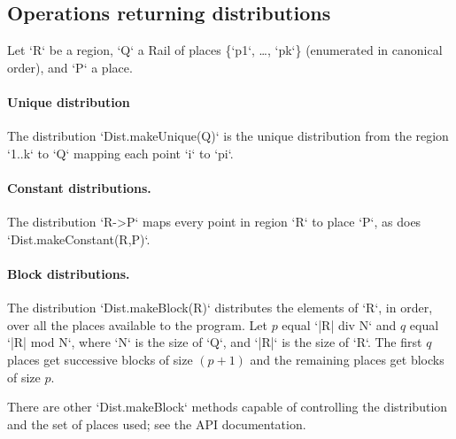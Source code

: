 {\subsection{Operations returning distributions}

Let \xcd`R` be a region, \xcd`Q` a Rail of places \{\xcd`p1`, \dots, \xcd`pk`\}
(enumerated in canonical order), and \xcd`P` a place.  

\paragraph{Unique distribution} 
The distribution \xcd`Dist.makeUnique(Q)` is the unique distribution from the
region \xcd`1..k` to \xcd`Q` mapping each point \xcd`i` to \xcd`pi`.

\paragraph{Constant distributions.} 
The distribution \xcd`R->P` maps every point in region \xcd`R` to place \xcd`P`, as does
\xcd`Dist.makeConstant(R,P)`. 

\paragraph{Block distributions.}
The distribution \xcd`Dist.makeBlock(R)` distributes the elements of \xcd`R`,
in order, over all the places available to the program. 
Let $p$ equal \xcd`|R| div N` and $q$ equal \xcd`|R| mod N`,
where \xcd`N` is the size of \xcd`Q`, and 
\xcd`|R|` is the size of \xcd`R`.  The first $q$ places get
successive blocks of size $(p+1)$ and the remaining places get blocks of
size $p$.

There are other \xcd`Dist.makeBlock` methods capable of controlling the
distribution and the set of places used; see the API documentation.


}
